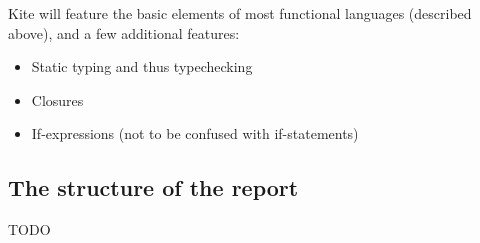 Kite will feature the basic elements of most functional languages (described above), and a few additional features:

\begin{itemize}

\item Static typing and thus typechecking
\item Closures
\item If-expressions (not to be confused with if-statements)

\end{itemize}

\subsection{The structure of the report}
TODO
